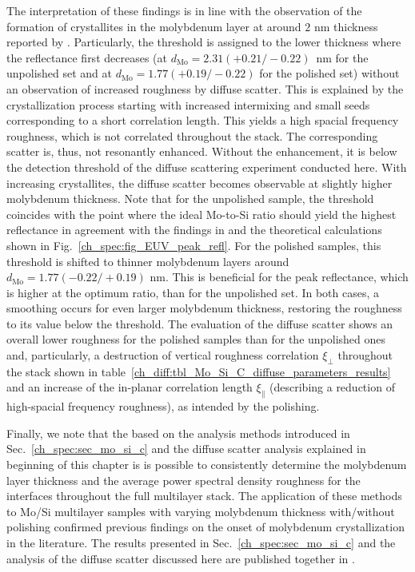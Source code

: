 The interpretation of these findings is in line with the observation of the formation of crystallites in the molybdenum layer at around $2$ nm thickness reported by \textcite{bajt_investigation_2001}. Particularly, the threshold is assigned to the lower thickness where the reflectance first decreases (at $d_\text{Mo}=2.31(+0.21/-0.22)$~nm for the unpolished set and at $d_\text{Mo}=1.77(+0.19/-0.22)$ for the polished set) without an observation of increased roughness by diffuse scatter. This is explained by the crystallization process starting with increased intermixing and small seeds corresponding to a short correlation length. This yields a high spacial frequency roughness, which is not correlated throughout the stack. The corresponding scatter is, thus, not resonantly enhanced. Without the enhancement, it is below the detection threshold of the diffuse scattering experiment conducted here. With increasing crystallites, the diffuse scatter becomes observable at slightly higher molybdenum thickness. Note that for the unpolished sample, the threshold coincides with the point where the ideal Mo-to-Si ratio should yield the highest reflectance in agreement with the findings in \cite{bajt_investigation_2001} and the theoretical calculations shown in Fig.~\ref{ch_spec:fig_EUV_peak_refl}. For the polished samples, this threshold is shifted to thinner molybdenum layers around $d_\text{Mo} = 1.77(-0.22/+0.19)$ nm. This is beneficial for the peak reflectance, which is higher at the optimum ratio, than for the unpolished set. In both cases, a smoothing occurs for even larger molybdenum thickness, restoring the roughness to its value below the threshold. The evaluation of the diffuse scatter shows an overall lower roughness for the polished samples than for the unpolished ones and, particularly, a destruction of vertical roughness correlation $\xi_\perp$ throughout the stack shown in table~\ref{ch_diff:tbl_Mo_Si_C_diffuse_parameters_results} and an increase of the in-planar correlation length $\xi_\parallel$ (describing a reduction of high-spacial frequency roughness), as intended by the polishing. 

Finally, we note that the based on the analysis methods introduced in Sec.~\ref{ch_spec:sec_mo_si_c} and the diffuse scatter analysis explained in beginning of this chapter is is possible to consistently determine the molybdenum layer thickness and the average power spectral density roughness for the interfaces throughout the full multilayer stack. The application of these methods to Mo/Si multilayer samples with varying molybdenum thickness with/without polishing confirmed previous findings on the onset of molybdenum crystallization in the literature. The results presented in Sec.~\ref{ch_spec:sec_mo_si_c} and the analysis of the diffuse scatter discussed here are published together in .

